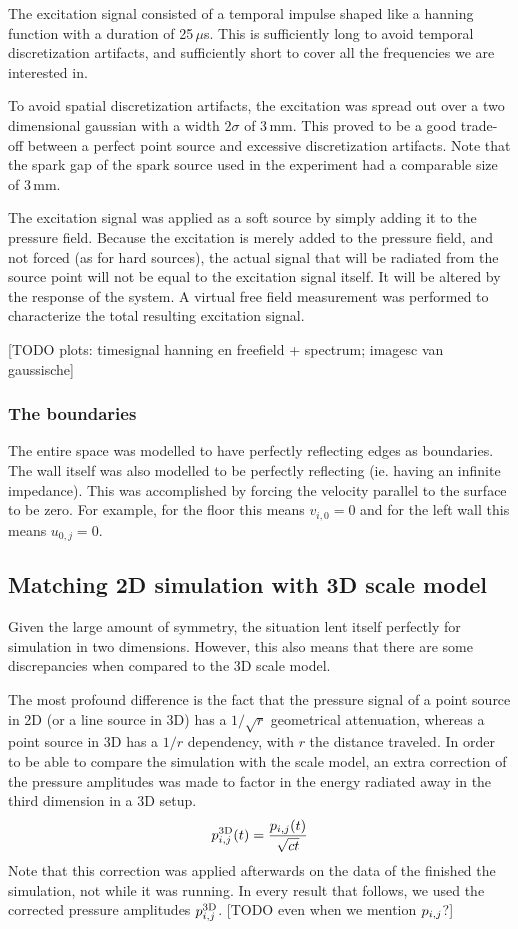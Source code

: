 The excitation signal consisted of a temporal impulse shaped like a hanning function with a duration of 25\,$\mu$s. This is sufficiently long to avoid temporal discretization artifacts, and sufficiently short to cover all the frequencies we are interested in.

To avoid spatial discretization artifacts, the excitation was spread out over a two dimensional gaussian with a width $2\sigma$ of 3\,mm. This proved to be a good trade-off between a perfect point source and excessive discretization artifacts. Note that the spark gap of the spark source used in the experiment had a comparable size of 3\,mm.

The excitation signal was applied as a soft 
source\cite{soft-hard-source} by simply adding it to the 
pressure field. Because the excitation is merely added to the pressure 
field, and not forced (as for hard sources), the actual signal that will be 
radiated from the source point will not be equal to the excitation signal 
itself. It will be altered by the response of the system. A virtual free 
field measurement was performed to characterize the total resulting 
excitation signal.

[TODO plots: timesignal hanning en freefield + spectrum; imagesc van gaussische]


\subsubsection*{The boundaries}
The entire space was modelled to have perfectly reflecting edges as boundaries. The wall itself was also modelled to be perfectly reflecting (ie. having an infinite impedance). This was accomplished by forcing the velocity parallel to the surface to be zero. For example, for the floor this means $v_{i,0} = 0$ and for the left wall this means $u_{0,j} = 0$.



\subsection{Matching 2D simulation with 3D scale model}
Given the large amount of symmetry, the situation lent itself perfectly for simulation in two dimensions. However, this also means that there are some discrepancies when compared to the 3D scale model.

The most profound difference is the fact that the pressure signal of a point source in 2D (or a line source in 3D) has a $1/\sqrt{r}$ geometrical attenuation, whereas a point source in 3D has a $1/r$ dependency, with $r$ the distance traveled. In order to be able to compare the simulation with the scale model, an extra correction of the pressure amplitudes was made to factor in the energy radiated away in the third dimension in a 3D setup.
$$
p_{i,j}^{\mathrm{3D}}(t) = \frac{p_{i,j}(t)}{\sqrt{ct}}
$$
Note that this correction was applied afterwards on the data of the finished the simulation, not while it was running. In every result that follows, we used the corrected pressure amplitudes $p_{i,j}^{\mathrm{3D}}$. [TODO even when we mention $p_{i,j}$?]



